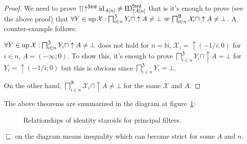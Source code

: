 \begin{proof}
We need to prove $\upuparrows\uparrow^{\mathsf{Strd}}\operatorname{id}_{A[n]}\neq\operatorname{ID}_{\uparrow A[n]}^{\mathsf{Strd}}$
that is it's enough to prove (see the above proof) that $\forall Y\in\operatorname{up}\mathcal{X}:\bigsqcap_{i\in n}^{\mathfrak{Z}}Y_{i}\sqcap\uparrow A\neq\bot\nLeftarrow\bigsqcap_{i\in n}^{\mathfrak{A}}\mathcal{X}_{i}\sqcap\uparrow A\neq\bot$.
A counter-example follows:

$\forall Y\in\operatorname{up}\mathcal{X}:\bigsqcap_{i\in n}^{\mathfrak{Z}}Y_{i}\sqcap\uparrow A\neq\bot$
does not hold for $n=\mathbb{N}$, $\mathcal{X}_{i}=\uparrow(-1/i;0)$
for $i\in n$, $A=(-\infty;0)$. To show this, it's enough to prove
$\bigsqcap_{i\in n}^{\mathfrak{Z}}Y_{i}\sqcap\uparrow A=\bot$
for $Y_{i}=\uparrow(-1/i;0)$ but this is obvious since $\bigsqcap_{i\in n}^{\mathfrak{Z}}Y_{i}=\bot$.

On the other hand, $\bigsqcap_{i\in n}^{\mathfrak{A}}\mathcal{X}_{i}\sqcap\uparrow A\neq\bot$
for the same $\mathcal{X}$ and $A$.
\end{proof}
The above theorems are summarized in the diagram at figure~\ref{fig:id-strd-princ}:

\begin{figure}[ht]

\caption{\label{fig:id-strd-princ}Relationships of identity staroids for principal
filters.}
\end{figure}

\begin{rem}
$\sqsubseteq$ on the diagram means inequality which can become strict
for some $A$ and $n$.
\end{rem}

